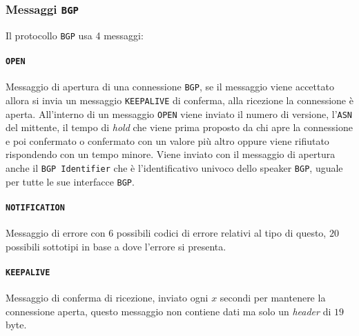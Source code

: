         \subsubsection{Messaggi \texttt{BGP}}
            Il protocollo \texttt{BGP} usa 4 messaggi:
            \paragraph{\texttt{OPEN}} Messaggio di apertura di una connessione \texttt{BGP}, se il messaggio viene accettato allora si invia un messaggio \texttt{KEEPALIVE} di conferma, alla ricezione la connessione è aperta. All'interno di un messaggio \texttt{OPEN} viene inviato il numero di versione, l'\texttt{ASN} del mittente, il tempo di \textit{hold} che viene prima proposto da chi apre la connessione e poi confermato o confermato con un valore più altro oppure viene rifiutato rispondendo con un tempo minore. Viene inviato con il messaggio di apertura anche il \texttt{BGP Identifier} che è l'identificativo univoco dello speaker \texttt{BGP}, uguale per tutte le sue interfacce \texttt{BGP}.
            \paragraph{\texttt{NOTIFICATION}} Messaggio di errore con $6$ possibili codici di errore relativi al tipo di questo, $20$ possibili sottotipi in base a dove l'errore si presenta. 
            \paragraph{\texttt{KEEPALIVE}} Messaggio di conferma di ricezione, inviato ogni $x$ secondi per mantenere la connessione aperta, questo messaggio non contiene dati ma solo un \textit{header} di $19$ byte.
